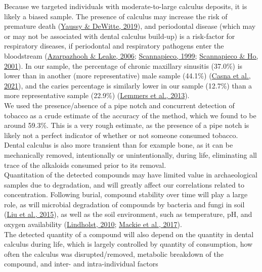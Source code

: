 \documentclass[
  letterpaper,
]{book}
\begin{document}
Because we targeted individuals with moderate-to-large calculus
deposits, it is likely a biased sample. The presence of calculus may
increase the risk of premature death
(\protect\hyperlink{ref-yaussyCalculusSurvivorship2019}{Yaussy \&
DeWitte, 2019}), and periodontal disease (which may or may not be
associated with dental calculus build-up) is a risk-factor for
respiratory diseases, if periodontal and respiratory pathogens enter the
bloodstream
(\protect\hyperlink{ref-azarpazhoohSystematicReview2006}{Azarpazhooh \&
Leake, 2006};
\protect\hyperlink{ref-scannapiecoRoleOral1999}{Scannapieco, 1999};
\protect\hyperlink{ref-scannapiecoPotentialAssociations2001}{Scannapieco
\& Ho, 2001}). In our sample, the percentage of chronic maxillary
sinusitis (37.0\%) is lower than in another (more representative) male
sample (44.1\%)
(\protect\hyperlink{ref-casnaUrbanizationRespiratory2021}{Casna et al.,
2021}), and the caries percentage is similarly lower in our sample
(12.7\%) than a more representative sample (22.9\%)
(\protect\hyperlink{ref-lemmersMiddenbeemster2013}{Lemmers et al.,
2013}).\\
We used the presence/absence of a pipe notch and concurrent detection of
tobacco as a crude estimate of the accuracy of the method, which we
found to be around 59.3\%. This is a very rough estimate, as the
presence of a pipe notch is likely not a perfect indicator of whether or
not someone consumed tobacco. Dental calculus is also more transient
than for example bone, as it can be mechanically removed, intentionally
or unintentionally, during life, eliminating all trace of the alkaloids
consumed prior to its removal.\\
Quantitation of the detected compounds may have limited value in
archaeological samples due to degradation, and will greatly affect our
correlations related to concentration. Following burial, compound
stability over time will play a large role, as will microbial
degradation of compounds by bacteria and fungi in soil
(\protect\hyperlink{ref-liuNicotinedegradingMicroorganisms2015}{Liu et
al., 2015}), as well as the soil environment, such as temperature, pH,
and oxygen availability
(\protect\hyperlink{ref-lindholstLongTerm2010}{Lindholst, 2010};
\protect\hyperlink{ref-mackiePreservationMetaproteome2017}{Mackie et
al., 2017}).\\
The detected quantity of a compound will also depend on the quantity in
dental calculus during life, which is largely controlled by quantity of
consumption, how often the calculus was disrupted/removed, metabolic
breakdown of the compound, and inter- and intra-individual factors
\end{document}
